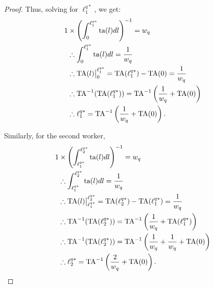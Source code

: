 \documentclass[hidelinks, nonatbib]{elsarticle}
\begin{document}
\begin{lemma}
\begin{proof}
        Thus, solving for $\ell_{1}^{q*}$, we get:
        \begin{align}
        1 
        &\times 
        \left(
            \int_{0}^{\ell_{1}^{q*}}
            \text{ta}(l)
            dl
        \right) ^ {-1}
        =
        w_q
        \\
        &\therefore
        \int_{0}^{\ell_{1}^{q*}}
        \text{ta}(l)
        dl
        =
        \frac{1}{w_q}
        \\
        &\therefore
        \text{TA}(l)
        \big|_{0}^{\ell_{1}^{q*}}
        =
        \text{TA}(\ell_{1}^{q*})
        -
        \text{TA}(0)
        =
        \frac{1}{w_q}
        \\
        &\therefore
        \text{TA}^{-1}(
            \text{TA}(\ell_{1}^{q*})
        )
        =
        \text{TA}^{-1}\left(
            \frac{1}{w_q}
            +
            \text{TA}(0)
        \right)
        \\
        &\therefore
        \ell_{1}^{q*}
        =
        \text{TA}^{-1}\left(
            \frac{1}{w_q}
            +
            \text{TA}(0)
        \right)
        .
        \end{align}
        
        Similarly, for the second worker,
        \begin{align}
        1 
        &\times 
        \left(
            \int_{\ell_{1}^{q*}}^{\ell_{2}^{q*}}
            \text{ta}(l)
            dl
        \right) ^ {-1}
        =
        w_q
        \\
        &\therefore
        \int_{\ell_{1}^{q*}}^{\ell_{2}^{q*}}
        \text{ta}(l)
        dl
        =
        \frac{1}{w_q}
        \\
        &\therefore
        \text{TA}(l)
        \big|_{\ell_{1}^{q*}}^{\ell_{2}^{q*}}
        =
        \text{TA}(\ell_{2}^{q*})
        -
        \text{TA}(\ell_{1}^{q*})
        =
        \frac{1}{w_q}
        \\
        &\therefore
        \text{TA}^{-1}(
            \text{TA}(\ell_{2}^{q*})
        )
        =
        \text{TA}^{-1}\left(
            \frac{1}{w_q}
            +
            \text{TA}(\ell_{1}^{q*})
        \right)
        \\
        &\therefore
        \text{TA}^{-1}(
            \text{TA}(\ell_{2}^{q*})
        )
        =
        \text{TA}^{-1}\left(
            \frac{1}{w_q}
            +
            \frac{1}{w_q}
            +
            \text{TA}(0)
        \right)
        \\
        &\therefore
        \ell_{2}^{q*}
        =
        \text{TA}^{-1}\left(
            \frac{2}{w_q}
            +
            \text{TA}(0)
        \right)
        .
        \end{align}
        

\end{proof}
\end{lemma}
\end{document}
